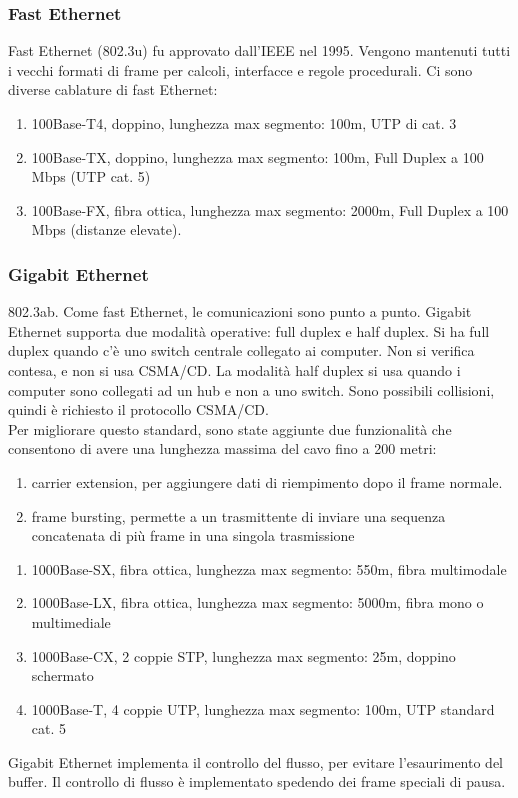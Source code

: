 \documentclass{article}
\begin{document}
\subsubsection{Fast Ethernet}
Fast Ethernet (802.3u) fu approvato dall'IEEE nel 1995. Vengono mantenuti tutti i vecchi formati di frame per calcoli, interfacce e regole procedurali. 
Ci sono diverse cablature di fast Ethernet:
\begin{enumerate}
\item 100Base-T4, doppino, lunghezza max segmento: 100m, UTP di cat. 3
\item 100Base-TX, doppino, lunghezza max segmento: 100m, Full Duplex a 100 Mbps (UTP cat. 5)
\item 100Base-FX, fibra ottica, lunghezza max segmento: 2000m, Full Duplex a 100 Mbps (distanze elevate).	
\end{enumerate}
\subsubsection{Gigabit Ethernet}
802.3ab. Come fast Ethernet, le comunicazioni sono punto a punto. Gigabit Ethernet supporta due modalità operative: full duplex e half duplex. Si ha full duplex quando c'è uno switch centrale collegato ai computer. Non si verifica contesa, e non si usa CSMA/CD. La modalità half duplex si usa quando i computer sono collegati ad un hub e non a uno switch. Sono possibili collisioni, quindi è richiesto il protocollo CSMA/CD. \\
Per migliorare questo standard, sono state aggiunte due funzionalità che consentono di avere una lunghezza massima del cavo fino a 200 metri:
\begin{enumerate}
\item carrier extension, per aggiungere dati di riempimento dopo il frame normale.
\item frame bursting, permette a un trasmittente di inviare una sequenza concatenata di più frame in una singola trasmissione
\end{enumerate}
\begin{enumerate}
\item 1000Base-SX, fibra ottica, lunghezza max segmento: 550m, fibra multimodale
\item 1000Base-LX, fibra ottica, lunghezza max segmento: 5000m, fibra mono o multimediale
\item 1000Base-CX, 2 coppie STP, lunghezza max segmento: 25m, doppino schermato
\item 1000Base-T, 4 coppie UTP, lunghezza max segmento: 100m, UTP standard cat. 5	
\end{enumerate}
Gigabit Ethernet implementa il controllo del flusso, per evitare l'esaurimento del buffer. Il controllo di flusso è implementato spedendo dei frame speciali di pausa.
\end{document}
